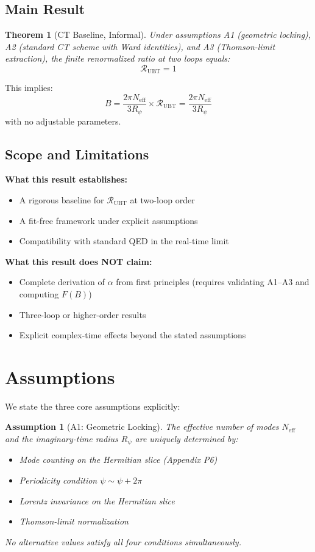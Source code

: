 \documentclass[11pt,a4paper]{article}
\newtheorem{theorem}{Theorem}
\newtheorem{assumption}{Assumption}
\begin{document}
\label{app:ct-baseline-R1}
\label{thm:RUBT-equals-one}

\subsection{Main Result}

\begin{theorem}[CT Baseline, Informal]
Under assumptions A1 (geometric locking), A2 (standard CT scheme with Ward identities), and A3 (Thomson-limit extraction), the finite renormalized ratio at two loops equals:
\[
\boxed{\mathcal{R}_{\mathrm{UBT}} = 1}
\]
\end{theorem}

This implies:
\[
B = \frac{2\pi N_{\mathrm{eff}}}{3R_\psi} \times \mathcal{R}_{\mathrm{UBT}} = \frac{2\pi N_{\mathrm{eff}}}{3R_\psi}
\]
with no adjustable parameters.

\subsection{Scope and Limitations}

\textbf{What this result establishes:}
\begin{itemize}
\item A rigorous baseline for $\mathcal{R}_{\mathrm{UBT}}$ at two-loop order
\item A fit-free framework under explicit assumptions
\item Compatibility with standard QED in the real-time limit
\end{itemize}

\textbf{What this result does NOT claim:}
\begin{itemize}
\item Complete derivation of $\alpha$ from first principles (requires validating A1--A3 and computing $F(B)$)
\item Three-loop or higher-order results
\item Explicit complex-time effects beyond the stated assumptions
\end{itemize}

\section{Assumptions}

We state the three core assumptions explicitly:

\begin{assumption}[A1: Geometric Locking]
\label{ass:A1}
The effective number of modes $N_{\mathrm{eff}}$ and the imaginary-time radius $R_\psi$ are uniquely determined by:
\begin{itemize}
\item Mode counting on the Hermitian slice (Appendix P6)
\item Periodicity condition $\psi \sim \psi + 2\pi$
\item Lorentz invariance on the Hermitian slice
\item Thomson-limit normalization
\end{itemize}
No alternative values satisfy all four conditions simultaneously.
\end{assumption}
\end{document}
